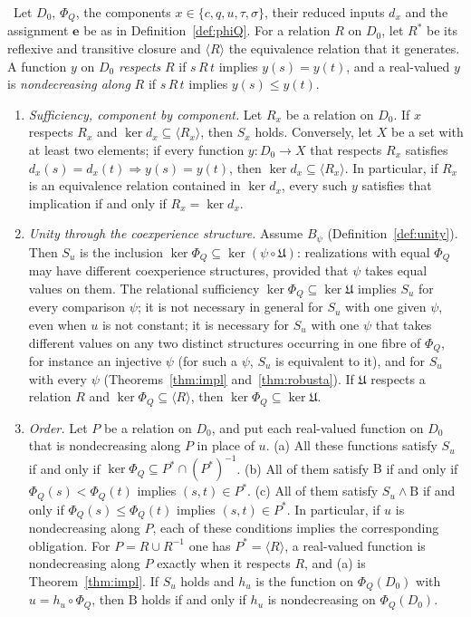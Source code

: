 \begin{theorem}\label{thm:conditional-discharge}
\stA\ Let $D_0$, $\Phi_Q$, the components $x\in\{c,q,u,\tau,\sigma\}$, their reduced inputs $d_x$ and the assignment $\mathbf e$ be as in Definition~\ref{def:phiQ}. For a relation $R$ on $D_0$, let $R^\ast$ be its reflexive and transitive closure and $\langle R\rangle$ the equivalence relation that it generates. A function $y$ on $D_0$ \emph{respects} $R$ if $s\,R\,t$ implies $y(s)=y(t)$, and a real-valued $y$ is \emph{nondecreasing along} $R$ if $s\,R\,t$ implies $y(s)\le y(t)$.
\begin{enumerate}
\item[(i)] \emph{Sufficiency, component by component.} Let $R_x$ be a relation on $D_0$. If $x$ respects $R_x$ and $\ker d_x\subseteq\langle R_x\rangle$, then $S_x$ holds. Conversely, let $X$ be a set with at least two elements; if every function $y:D_0\to X$ that respects $R_x$ satisfies $d_x(s)=d_x(t)\Rightarrow y(s)=y(t)$, then $\ker d_x\subseteq\langle R_x\rangle$. In particular, if $R_x$ is an equivalence relation contained in $\ker d_x$, every such $y$ satisfies that implication if and only if $R_x=\ker d_x$.
\item[(ii)] \emph{Unity through the coexperience structure.} Assume $B_\psi$ (Definition~\ref{def:unity}). Then $S_u$ is the inclusion $\ker\Phi_Q\subseteq\ker(\psi\circ\mathfrak U)$: realizations with equal $\Phi_Q$ may have different coexperience structures, provided that $\psi$ takes equal values on them. The relational sufficiency $\ker\Phi_Q\subseteq\ker\mathfrak U$ implies $S_u$ for every comparison $\psi$; it is not necessary in general for $S_u$ with one given $\psi$, even when $u$ is not constant; it is necessary for $S_u$ with one $\psi$ that takes different values on any two distinct structures occurring in one fibre of $\Phi_Q$, for instance an injective $\psi$ (for such a $\psi$, $S_u$ is equivalent to it), and for $S_u$ with every $\psi$ (Theorems~\ref{thm:impl} and~\ref{thm:robusta}). If $\mathfrak U$ respects a relation $R$ and $\ker\Phi_Q\subseteq\langle R\rangle$, then $\ker\Phi_Q\subseteq\ker\mathfrak U$.
\item[(iii)] \emph{Order.} Let $P$ be a relation on $D_0$, and put each real-valued function on $D_0$ that is nondecreasing along $P$ in place of $u$. (a) All these functions satisfy $S_u$ if and only if $\ker\Phi_Q\subseteq P^\ast\cap(P^\ast)^{-1}$. (b) All of them satisfy $\mathrm B$ if and only if $\Phi_Q(s)<\Phi_Q(t)$ implies $(s,t)\in P^\ast$. (c) All of them satisfy $S_u\wedge\mathrm B$ if and only if $\Phi_Q(s)\le\Phi_Q(t)$ implies $(s,t)\in P^\ast$. In particular, if $u$ is nondecreasing along $P$, each of these conditions implies the corresponding obligation. For $P=R\cup R^{-1}$ one has $P^\ast=\langle R\rangle$, a real-valued function is nondecreasing along $P$ exactly when it respects $R$, and (a) is Theorem~\ref{thm:impl}. If $S_u$ holds and $h_u$ is the function on $\Phi_Q(D_0)$ with $u=h_u\circ\Phi_Q$, then $\mathrm B$ holds if and only if $h_u$ is nondecreasing on $\Phi_Q(D_0)$.

\end{enumerate}
\end{theorem}
